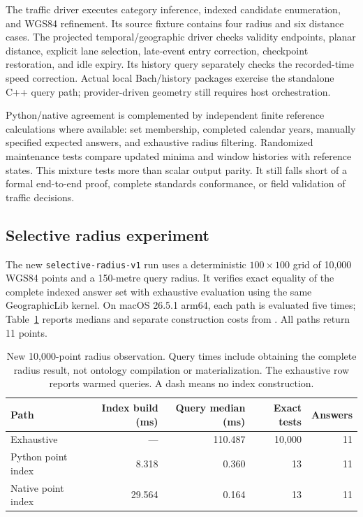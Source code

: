 \documentclass{article}
\newcommand{\code}[1]{\texttt{#1}}
\begin{document}
The traffic driver executes category inference, indexed candidate enumeration,
and WGS84 refinement. Its source fixture contains four radius and six distance
cases. The projected temporal/geographic driver checks validity endpoints,
planar distance, explicit lane selection, late-event entry correction, checkpoint
restoration, and idle expiry. Its history query separately checks the recorded-time
speed correction. Actual local Bach/history packages exercise the standalone
C++ query path; provider-driven geometry still requires host orchestration.

Python/native agreement is complemented by independent finite reference
calculations where available: set membership, completed calendar years, manually
specified expected answers, and exhaustive radius filtering. Randomized
maintenance tests compare updated minima and window histories with reference
states. This mixture tests more than scalar output parity. It still falls short
of a formal end-to-end proof, complete standards conformance, or field validation
of traffic decisions.

\subsection{Selective radius experiment}
The new \code{selective-radius-v1} run uses a deterministic $100\times100$ grid
of 10,000 WGS84 points and a 150-metre query radius. It verifies exact equality
of the complete indexed answer set with exhaustive evaluation using the same
GeographicLib kernel. On macOS 26.5.1 arm64, each path is evaluated five times;
Table~\ref{tab:spatial} reports medians and separate construction costs from
. All paths return 11 points.

\begin{table}[t]
\centering\small
\caption{New 10,000-point radius observation. Query times include obtaining the
complete radius result, not ontology compilation or materialization. The
exhaustive row reports warmed queries. A dash means no index construction.}
\label{tab:spatial}
\begin{tabular}{lrrrr}
\toprule
Path & Index build (ms) & Query median (ms) & Exact tests & Answers \\
\midrule
Exhaustive & --- & 110.487 & 10,000 & 11 \\
Python point index & 8.318 & 0.360 & 13 & 11 \\
Native point index & 29.564 & 0.164 & 13 & 11 \\
\bottomrule
\end{tabular}
\end{table}
\end{document}
